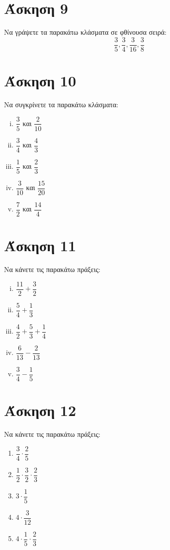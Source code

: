 \documentclass[a4paper,10pt]{report}
\begin{document}
\section*{Άσκηση 9  \hfill \small{}}
Να γράψετε τα παρακάτω κλάσματα σε φθίνουσα σειρά:
$$ \dfrac{3}{5}, \dfrac{3}{4}, \dfrac{3}{16}, \dfrac{3}{8} $$

\section*{Άσκηση 10  \hfill \small{}}
Να συγκρίνετε τα παρακάτω κλάσματα:
\begin{enumerate}[i)]
 \item $\dfrac{3}{5}$ και $\dfrac{2}{10}$
 \item $\dfrac{3}{4}$ και $\dfrac{4}{3}$
 \item $\dfrac{1}{5}$ και $\dfrac{2}{3}$
 \item $\dfrac{3}{10}$ και $\dfrac{15}{20}$
 \item $\dfrac{7}{2}$ και $\dfrac{14}{4}$
\end{enumerate}

\section*{Άσκηση 11  \hfill \small{}}
Να κάνετε τις παρακάτω πράξεις:
\begin{enumerate}[i)]
 \item $\dfrac{11}{2}+\dfrac{3}{2}$
 \item $\dfrac{5}{4}+\dfrac{1}{3}$
 \item $\dfrac{4}{2}+\dfrac{5}{3}+\dfrac{1}{4}$
 \item $\dfrac{6}{13}-\dfrac{2}{13}$
 \item $\dfrac{3}{4}-\dfrac{1}{5}$
\end{enumerate}


\section*{Άσκηση 12  \hfill \small{}}
Να κάνετε τις παρακάτω πράξεις:
\begin{enumerate}
 \item $\dfrac{3}{4}\cdot \dfrac{2}{5}$
 \item $\dfrac{1}{2}\cdot \dfrac{3}{2}\cdot \dfrac{2}{3}$
 \item $3\cdot \dfrac{1}{5}$
 \item $4\cdot \dfrac{3}{12}$
 \item $4\cdot \dfrac{1}{5}\cdot \dfrac{2}{3}$
\end{enumerate}
\end{document}

